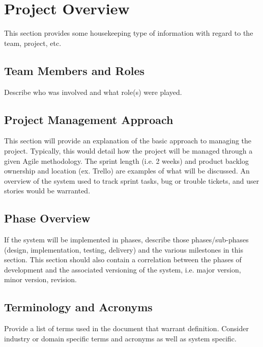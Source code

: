 

\chapter{Project Overview}
This section provides some housekeeping type of information with regard to the 
team, project, etc. 



\section{Team Members and Roles}
Describe who was involved and what role(s) were played. 


\section{Project  Management Approach}
This section will provide an explanation of the basic approach to managing the 
project.  Typically, this would detail how the project will be managed through 
a given Agile methodology.  The sprint length (i.e. 2 weeks) and product backlog 
ownership and location (ex. Trello) are examples of what will be discussed.  An 
overview of the system used to track sprint tasks, bug or trouble tickets, and 
user stories would be warranted. 


\section{Phase  Overview}


If the system will be implemented in phases, describe those phases/sub-phases (design, 
implementation, testing, delivery) and the various milestones in this section. 
 This section should also contain a correlation between the phases of development 
and the associated versioning of the system, i.e. major version, minor version, 
revision. 

\section{Terminology and Acronyms}
Provide a list of terms used in the document that warrant definition.  Consider 
industry or domain specific terms and acronyms as well as system specific. 
